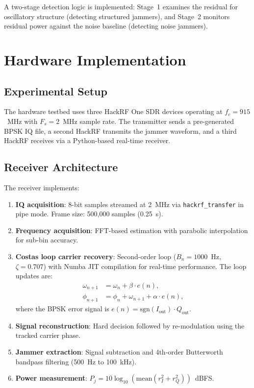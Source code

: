 \documentclass[conference]{IEEEtran}
\begin{document}
A two-stage detection logic is implemented: Stage~1 examines the residual for oscillatory structure (detecting structured jammers), and Stage~2 monitors residual power against the noise baseline (detecting noise jammers).

\section{Hardware Implementation}

\subsection{Experimental Setup}

The hardware testbed uses three HackRF One SDR devices operating at $f_c = 915$~MHz with $F_s = 2$~MHz sample rate. The transmitter sends a pre-generated BPSK IQ file, a second HackRF transmits the jammer waveform, and a third HackRF receives via a Python-based real-time receiver.

\subsection{Receiver Architecture}

The receiver implements:
\begin{enumerate}
\item \textbf{IQ acquisition}: 8-bit samples streamed at 2~MHz via \texttt{hackrf\_transfer} in pipe mode. Frame size: 500,000 samples (0.25~s).
\item \textbf{Frequency acquisition}: FFT-based estimation with parabolic interpolation for sub-bin accuracy.
\item \textbf{Costas loop carrier recovery}: Second-order loop ($B_n = 1000$~Hz, $\zeta = 0.707$) with Numba JIT compilation for real-time performance. The loop updates are:
\begin{align}
\omega_{n+1} &= \omega_n + \beta \cdot e(n), \\
\phi_{n+1} &= \phi_n + \omega_{n+1} + \alpha \cdot e(n),
\end{align}
where the BPSK error signal is $e(n) = \mathrm{sgn}(I_{\mathrm{out}})\cdot Q_{\mathrm{out}}$.
\item \textbf{Signal reconstruction}: Hard decision followed by re-modulation using the tracked carrier phase.
\item \textbf{Jammer extraction}: Signal subtraction and 4th-order Butterworth bandpass filtering (500~Hz to 100~kHz).
\item \textbf{Power measurement}: $P_j = 10\log_{10}(\mathrm{mean}(r_I^2 + r_Q^2))$~dBFS.
\end{enumerate}
\end{document}
